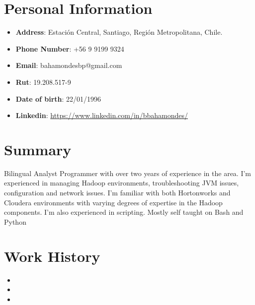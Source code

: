 \documentclass[11pt,a4paper,roman]{moderncv}        %
\begin{document}
\makecvtitle
\vspace*{-15mm}

\section{Personal Information}

\begin{itemize}
\item{\textbf{Address}: Estación Central, Santiago, Región Metropolitana, Chile.}
\item{\textbf{Phone Number}: +56 9 9199 9324}
\item{\textbf{Email}: bahamondesbp@gmail.com}
\item{\textbf{Rut}: 19.208.517-9}
\item{\textbf{Date of birth}: 22/01/1996}
\item{\textbf{Linkedin}: \url{https://www.linkedin.com/in/bbahamondes/}}
\end{itemize}


\section{Summary}
\small{Bilingual Analyst Programmer with over two years of experience in the area. I'm experienced in managing Hadoop environments, troubleshooting JVM issues, configuration and network issues. I'm familiar with both Hortonworks and Cloudera environments with varying degrees of expertise in the Hadoop components. I'm also experienced in scripting. Mostly self taught on Bash and Python}

\section{Work History}
\begin{itemize}
\item{}
\vspace{3pt}
\item{}
\vspace{3pt}
\item{}
\end{itemize}
\end{document}
